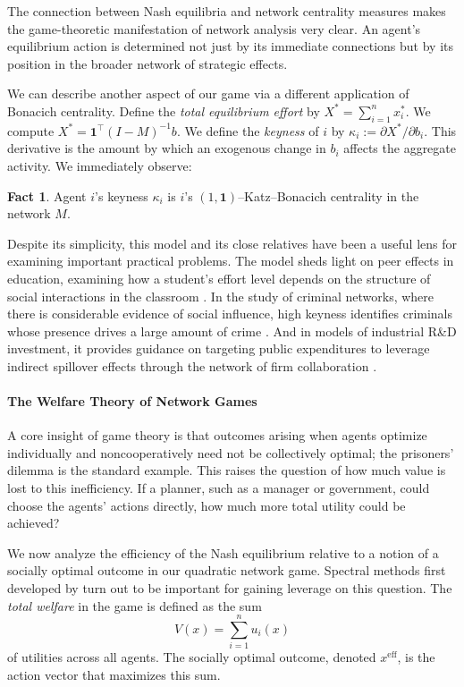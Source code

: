 \documentclass{notices}
\theoremstyle{definition}\newtheorem{problem}{Problem}
\theoremstyle{definition} \newtheorem{remark}{Remark}
\theoremstyle{definition} \newtheorem{claim}{Claim}
\theoremstyle{definition} \newtheorem{thm}{Theorem}
\theoremstyle{definition} \newtheorem*{thmNoNum}{Theorem}
\theoremstyle{definition} \newtheorem{definition}{Definition}
\theoremstyle{definition} \theoremstyle{remark}
\theoremstyle{definition} \newtheorem{note}{Note}
\theoremstyle{definition} \newtheorem{notation}{Notation}
\theoremstyle{definition} \theoremstyle{plain}
\theoremstyle{definition} \newtheorem{condition}{Condition}
\theoremstyle{definition} \newtheorem{lem}{Lemma}
\theoremstyle{definition} \newtheorem{corollary}{Corollary}
\theoremstyle{definition} \newtheorem{prop}{Proposition}
\theoremstyle{definition} \newtheorem{ax}{Axiom}
\theoremstyle{definition} \newtheorem{assumption}{Assumption}
\theoremstyle{definition} \newtheorem{example}{Example}
\theoremstyle{definition} \newtheorem{rmk}{Remark}
\theoremstyle{definition} \newtheorem{res}{Result}
\theoremstyle{definition} \newtheorem{que}{Question}
\theoremstyle{definition} \newtheorem{conjecture}{Conjecture}
\newtheorem{fact}{Fact}
\theoremstyle{definition}
\begin{document}
The connection between Nash equilibria and network centrality measures makes the game-theoretic manifestation of network analysis very clear. An agent's equilibrium action is determined not just by its immediate connections but by its position in the broader network of strategic effects.


We can describe another aspect of our game via a different
application of Bonacich centrality.
Define the \emph{total equilibrium effort} by $X^{*}=\sum_{i=1}^n x_{i}^{*}$. We compute $X^* = \bm{1}^\top (I-M)^{-1} {b}$. 
We define the \emph{keyness} of $i$ by $\kappa_i := \partial X^*/\partial b_i$.
This derivative is the amount by which an exogenous change in $b_i$ affects
the aggregate activity. We immediately observe:
\begin{fact} Agent $i$'s keyness $\kappa_i$ is $i$'s $(1,\bm{1})$--Katz--Bonacich centrality in the network $M$. \end{fact}


Despite its simplicity, this model and its close relatives have been a useful lens for examining important practical problems. 
The model sheds light on peer effects in education, examining how a student's effort level depends on the structure of social interactions in the classroom \cite{CalvoArmengolPatacchiniZenou2009}. 
 In the study of criminal networks, where there is considerable evidence of social influence, high keyness identifies criminals whose presence drives a large amount of crime \cite{LPVZ24}. And in models of industrial R\&D investment, it provides guidance on targeting public expenditures to leverage indirect spillover effects through the network of firm collaboration \cite{KonigLiuZenou2019}.

\paragraph{The Welfare Theory of Network Games}

A core insight of game theory is that outcomes arising when agents optimize individually and noncooperatively need not be collectively optimal; the prisoners' dilemma is the standard example. This raises the question of how much value is lost to this inefficiency. If a planner, such as a manager or government, could choose the agents' actions directly, how much more total utility could be achieved?

We now analyze the efficiency of the Nash equilibrium relative to a notion of a socially optimal outcome in our quadratic network game. Spectral methods first developed by \cite{bindel2015bad} turn out to be important for gaining leverage on this question. The \emph{total welfare} in the game is defined as the sum \begin{equation} V(x) = \sum_{i=1}^n u_i(x) \label{eq:welfare_game} \end{equation} of utilities across all agents.  The socially optimal outcome, denoted $x^{\mathrm{eff}}$, is the action vector that maximizes this sum. 
\end{document}
